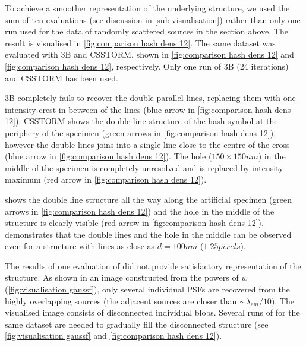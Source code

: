 To achieve a smoother representation of the underlying structure, we used the sum of ten \inmf{} evaluations (see discussion in \autoref{sub:visualisation}) rather than only one \inmf{} run used for the data of randomly scattered sources in the section above. The result is visualised in \autoref{fig:comparison hash dens 12}\bbb. The same dataset was evaluated with 3B and CSSTORM, shown in  \autoref{fig:comparison hash dens 12}\ccc{} and \autoref{fig:comparison hash dens 12}\ddd, respectively. Only one run of 3B (24 iterations) and CSSTORM has been used. 

3B completely fails to recover the double parallel lines, replacing them with one intensity crest in between of the lines (blue arrow in \autoref{fig:comparison hash dens 12}\ddd). CSSTORM shows the double line structure of the hash symbol at the periphery of the specimen (green arrows in \autoref{fig:comparison hash dens 12}\ccc), however the double lines joins into a single line close to the centre of the cross  (blue arrow in \autoref{fig:comparison hash dens 12}\ccc). The hole ($150 \times 150 \unit{nm}$) in the middle of the specimen is completely unresolved and is replaced by intensity maximum (red arrow in \autoref{fig:comparison hash dens 12}\ccc). 

\inmf{} shows the double line structure all the way along the artificial specimen (green arrows in \autoref{fig:comparison hash dens 12}\bbb) and  the hole in the middle of the structure is clearly visible (red arrow in \autoref{fig:comparison hash dens 12}\bbb). \ddd{} demonstrates that the double lines and the hole in the middle can be observed even for a structure with lines as close as $d=100\unit{nm}$ ($1.25 \unit{pixels}$). 

The results of one evaluation of \inmf{} did not provide satisfactory representation of the structure. As shown in an image constructed from the powers of $w$ (\autoref{fig:visualisation gaussf}\ccc), only several individual PSFs are recovered from the highly overlapping sources (the adjacent sources are closer than $\sim \lambda_{em}/10)$. The visualised image consists of disconnected individual blobs. Several runs of \inmf{} for the same dataset are needed to gradually fill the disconnected structure (see \autoref{fig:visualisation gaussf}\ddd{} and \ref{fig:comparison hash dens 12}\bbb).

